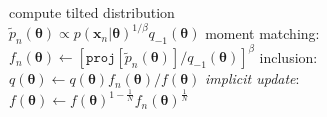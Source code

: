 \documentclass{article} %
\begin{document}
\begin{figure}[!t]
\begin{minipage}[t]{0.45\linewidth}
\begin{algorithm}[H]
\begin{algorithmic}[1]
	\STATE compute tilted distribution \\$\tilde{p}_n(\bm{\theta}) \propto p(\bm{x}_n|\bm{\theta})^{1/\beta} q_{-1}(\bm{\theta})$
	\STATE moment matching: \\\hspace{-1mm}$f_n(\bm{\theta}) \leftarrow [\mathtt{proj}[\tilde{p}_n(\bm{\theta})] / q_{-1}(\bm{\theta})]^{\beta} $
	\STATE inclusion:\\ $q(\bm{\theta}) \leftarrow q(\bm{\theta}) f_n(\bm{\theta}) / f(\bm{\theta})$
	\STATE \textit{implicit update}:\\ $f(\bm{\theta}) \leftarrow f(\bm{\theta})^{1 - \frac{1}{N}} f_n(\bm{\theta})^{\frac{1}{N}}$
\end{algorithmic}
\end{algorithm}
\end{minipage} 
%
\end{figure}
\end{document}
